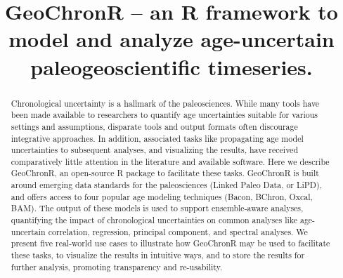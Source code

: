 \documentclass[gchron, manuscript]{copernicus}
\begin{document}
\title{GeoChronR -- an R framework to model and analyze age-uncertain paleogeoscientific timeseries.}














\received{}
\pubdiscuss{} %
\revised{}
\accepted{}
\published{}




\maketitle


\begin{abstract}
Chronological uncertainty is a hallmark of the paleosciences. While many tools have been made available to researchers to quantify age uncertainties suitable for various settings and assumptions, disparate tools and output formats often discourage integrative approaches. In addition, associated tasks like propagating age model uncertainties to subsequent analyses, and visualizing the results, have received comparatively little attention in the literature and available software. Here we describe GeoChronR, an open-source R package to facilitate these tasks. GeoChronR is built around emerging data standards for the paleosciences (Linked Paleo Data, or LiPD), and offers access to four popular age modeling techniques (Bacon, BChron, Oxcal, BAM). The output of these models is used to support ensemble-aware analyses, quantifying the impact of chronological uncertainties on common analyses like age-uncertain correlation, regression, principal component, and spectral analyses. We present five real-world use cases to illustrate how GeoChronR may be used to facilitate these tasks, to visualize the results in intuitive ways, and to store the results for further analysis, promoting transparency and re-usability.
\end{abstract}
\end{document}

